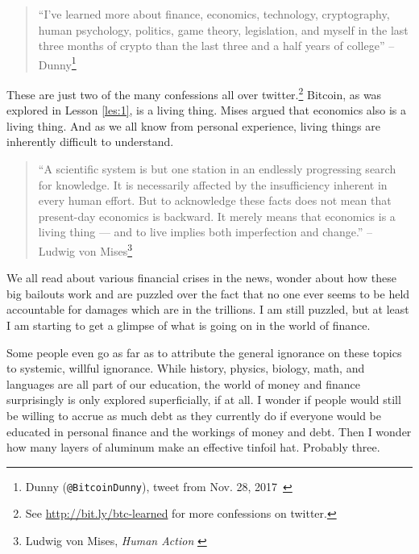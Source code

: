 \begin{quotation}\begin{samepage}
\enquote{I've learned more about finance, economics, technology, cryptography, human
psychology, politics, game theory, legislation, and myself in the last three
months of crypto than the last three and a half years of college}
\flushright -- Dunny\footnote{Dunny (\texttt{@BitcoinDunny}), tweet from Nov. 28,
2017~\cite{bitcoindunny-tweet}}
\end{samepage}\end{quotation}

These are just two of the many confessions all over twitter.\footnote{See
\url{http://bit.ly/btc-learned} for more confessions on twitter.} Bitcoin, as
was explored in Lesson \ref{les:1}, is a living thing. Mises argued that
economics also is a living thing. And as we all know from personal experience,
living things are inherently difficult to understand.

\begin{quotation}\begin{samepage}
\enquote{A scientific system is but one station in an endlessly progressing
search for knowledge. It is necessarily affected by the insufficiency
inherent in every human effort. But to acknowledge these facts does
not mean that present-day economics is backward. It merely means that
economics is a living thing --- and to live implies both imperfection
and change.}
\flushright -- Ludwig von Mises\footnote{Ludwig von Mises, \textit{Human Action}
\cite{human-action}}
\end{samepage}\end{quotation}

\newpage

We all read about various financial crises in the news, wonder about how
these big bailouts work and are puzzled over the fact that no one ever
seems to be held accountable for damages which are in the trillions. I
am still puzzled, but at least I am starting to get a glimpse of what is
going on in the world of finance.

Some people even go as far as to attribute the general ignorance on
these topics to systemic, willful ignorance. While history, physics,
biology, math, and languages are all part of our education, the world of
money and finance surprisingly is only explored superficially, if at
all. I wonder if people would still be willing to accrue as much debt as
they currently do if everyone would be educated in personal finance and
the workings of money and debt. Then I wonder how many layers of
aluminum make an effective tinfoil hat. Probably three.

